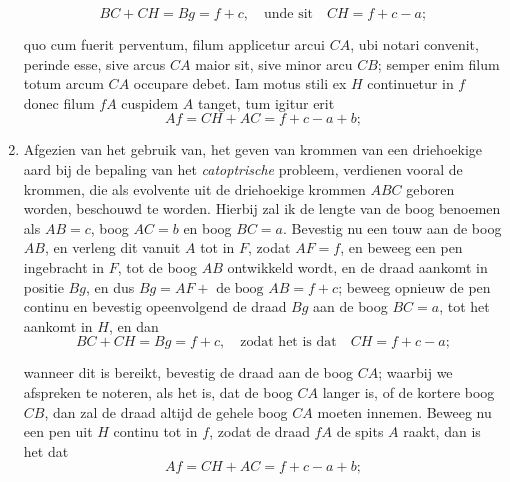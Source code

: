 \documentclass[10pt,a4paper]{article}
\newcommand{\switchenum}{\setcounter{enumi}{\arabic{enumi}-1}\switchcolumn}
\begin{document}
\begin{paracol}{2}
\begin{enumerate}[topsep=1px]
		\[
			BC+CH = Bg = f+c, \quad \text{unde sit} \quad CH = f+c-a;
		\]
		\par quo cum fuerit perventum, filum applicetur arcui $CA$, ubi notari convenit, perinde esse, sive arcus $CA$ maior sit, sive minor arcu $CB$; semper enim filum totum arcum $CA$ occupare debet. Iam motus stili ex $H$ continuetur in $f$ donec filum $fA$ cuspidem $A$ tanget, tum igitur erit 
		\[
			Af = CH + AC = f+c-a+b;
		\]
			
		\switchenum
		\item Afgezien van het gebruik van, het geven van krommen van een driehoekige aard bij de bepaling van het \textit{catoptrische} probleem, verdienen vooral de krommen, die als evolvente uit de driehoekige krommen $ABC$ geboren worden, beschouwd te worden. Hierbij zal ik de lengte van de boog benoemen als $AB = c$, boog $AC=b$ en boog $BC=a$. Bevestig nu een touw aan de boog $AB$, en verleng dit vanuit $A$ tot in $F$, zodat $AF=f$, en beweeg een pen ingebracht in $F$, tot de boog $AB$ ontwikkeld wordt, en de draad aankomt in positie $Bg$, en dus $Bg = AF + \text{ de boog } AB = f+c$; beweeg opnieuw de pen continu en bevestig opeenvolgend de draad $Bg$ aan de boog $BC=a$, tot het aankomt in $H$, en dan
		\[
			BC+CH = Bg = f+c, \quad \text{zodat het is dat} \quad CH = f+c-a;
		\]
		\par wanneer dit is bereikt, bevestig de draad aan de boog $CA$; waarbij we afspreken te noteren, als het is, dat de boog $CA$ langer is, of de kortere boog $CB$, dan zal de draad altijd de gehele boog $CA$ moeten innemen. Beweeg nu een pen uit $H$ continu tot in $f$, zodat de draad $fA$ de spits $A$ raakt, dan is het dat  
		\[
			Af = CH + AC = f+c-a+b;
		\]
		

\end{enumerate}
\end{paracol}
\end{document}
